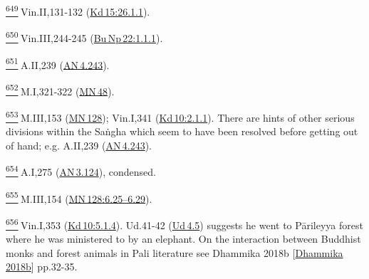 \label{footprints_split_025.html_fn649}
\hyperref[footprints_split_016.htmlux5cux23fnref649]{\textsuperscript{649}} Vin.II,131-132
(\href{https://suttacentral.net/pli-tv-kd15/en/brahmali\#26.1.1}{Kd\,15:26.1.1}).

\label{footprints_split_025.html_fn650}
\hyperref[footprints_split_016.htmlux5cux23fnref650]{\textsuperscript{650}} Vin.III,244-245
(\href{https://suttacentral.net/pli-tv-bu-vb-np22/en/brahmali\#1.1.1}{Bu\,Np\,22:1.1.1}).

\label{footprints_split_025.html_fn651}
\hyperref[footprints_split_016.htmlux5cux23fnref651]{\textsuperscript{651}} A.II,239
(\href{https://suttacentral.net/an4.243/en/sujato}{AN\,4.243}).

\label{footprints_split_025.html_fn652}
\hyperref[footprints_split_016.htmlux5cux23fnref652]{\textsuperscript{652}} M.I,321-322
(\href{https://suttacentral.net/mn48/en/sujato}{MN\,48}).

\label{footprints_split_025.html_fn653}
\hyperref[footprints_split_016.htmlux5cux23fnref653]{\textsuperscript{653}} M.III,153
(\href{https://suttacentral.net/mn128/en/sujato}{MN\,128}); Vin.I,341
(\href{https://suttacentral.net/pli-tv-kd10/en/brahmali\#2.1.1}{Kd\,10:2.1.1}).
There are hints of other serious divisions within the Saṅgha which seem
to have been resolved before getting out of hand; e.g. A.II,239
(\href{https://suttacentral.net/an4.243/en/sujato}{AN\,4.243}).

\label{footprints_split_025.html_fn654}
\hyperref[footprints_split_016.htmlux5cux23fnref654]{\textsuperscript{654}} A.I,275
(\href{https://suttacentral.net/an3.124/en/sujato}{AN\,3.124}),
condensed.

\label{footprints_split_025.html_fn655}
\hyperref[footprints_split_016.htmlux5cux23fnref655]{\textsuperscript{655}} M.III,154
(\href{https://suttacentral.net/mn128/en/sujato\#6.25}{MN\,128:6.25--6.29}).

\label{footprints_split_025.html_fn656}
\hyperref[footprints_split_016.htmlux5cux23fnref656]{\textsuperscript{656}} Vin.I,353
(\href{https://suttacentral.net/pli-tv-kd10/en/brahmali\#5.1.4}{Kd\,10:5.1.4}).
Ud.41-42 (\href{https://suttacentral.net/ud4.5/en/sujato}{Ud\,4.5})
suggests he went to Pārileyya forest where he was ministered to by an
elephant. On the interaction between Buddhist monks and forest animals
in Pali literature see {Dhammika 2018b
{{[}\hyperref[footprints_split_022.htmlux5cux23Dhammikaux5cux25202018b]{Dhammika
2018b}{]}}} pp.32-35.

